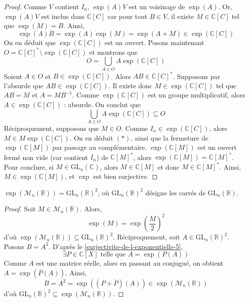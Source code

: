 \begin{proof}
    \newpar
    Comme $V$ contient $I_n$, $\exp(A)V$ est un voisinage de $\exp(A)$. Or, $\exp(A)V$ est inclus dans $\mathbb{C}[C]$ car pour tout $B \in V$, il existe $M \in \mathbb{C}[C]$ tel que $\exp(M)=B$. Ainsi,
    \[ \exp(A)B = \exp(A)\exp(M) = \exp(A+M) \in \exp(\mathbb{C}[C]) \]
    On en déduit que $\exp(\mathbb{C}[C])$ est un ouvert.
    \newpar
    Posons maintenant $O = \mathbb{C}[C]^* \setminus \exp(\mathbb{C}[C])$ et montrons que
    \[ O = \bigcup_{A \in O} A\exp(\mathbb{C}[C]) \tag{$*$} \]
    Soient $A \in O$ et $B \in \exp(\mathbb{C}[C])$. Alors $AB \in \mathbb{C}[C]^*$. Supposons par l'absurde que $AB \in \exp(\mathbb{C}[C])$. Il existe donc $M \in \exp(\mathbb{C}[C])$ tel que $AB = M$ et $A=MB^{-1}$. Comme $\exp(\mathbb{C}[C])$ est un groupe multiplicatif, alors $A \in \exp(\mathbb{C}[C])$ : absurde. On conclut que
    \[ \bigcup_{A \in O} A\exp(\mathbb{C}[C]) \subseteq O \]
    Réciproquement, supposons que $M \in O$. Comme $I_n \in \exp(\mathbb{C}[C])$, alors $M \in M\exp(\mathbb{C}[C])$. On en déduit $(*)$, ainsi que la fermeture de $\exp(\mathbb{C}[M])$ par passage au complémentaire.
    \newpar
    $\exp(\mathbb{C}[M])$ est un ouvert fermé non vide (car contient $I_n$) de $\mathbb{C}[M]^*$, alors $\exp(\mathbb{C}[M]) = \mathbb{C}[M]^*$. Pour conclure, si $M \in \mathrm{GL}_n(\mathbb{C})$, alors $M \in \mathbb{C}[M]$ et donc $M \in \mathbb{C}[M]^*$. Ainsi, $M \in \exp(\mathbb{C}[M])$, et $\exp$ est bien surjective.
  \end{proof}

  \begin{application}
    $\exp(\mathcal{M}_n(\mathbb{R})) = \mathrm{GL}_n(\mathbb{R})^2$, où $\mathrm{GL}_n(\mathbb{R})^2$ désigne les carrés de $\mathrm{GL}_n(\mathbb{R})$.
  \end{application}

  \begin{proof}
    Soit $M \in \mathcal{M}_n(\mathbb{R})$. Alors,
    \[ \exp(M) = \exp \left( \frac{M}{2} \right)^2 \]
    d'où $\exp(\mathcal{M}_n(\mathbb{R})) \subseteq \mathrm{GL}_n(\mathbb{R})^2$. Réciproquement, soit $A \in \mathrm{GL}_n(\mathbb{R})^2$. Posons $B = A^2$. D'après le \cref{surjectivite-de-l-exponentielle-5},
    \[ \exists P \in \mathbb{C}[X] \text{ telle que } A = \exp(P(A)) \]
    Comme $A$ est une matrice réelle, alors en passant au conjugué, on obtient $A = \exp(\overline{P}(A))$. Ainsi,
    \[ B = A^2 = \exp((P + \overline{P})(A)) \in \exp(\mathcal{M}_n(\mathbb{R})) \]
    d'où $\mathrm{GL}_n(\mathbb{R})^2 \subseteq \exp(\mathcal{M}_n(\mathbb{R}))$.
  \end{proof}

